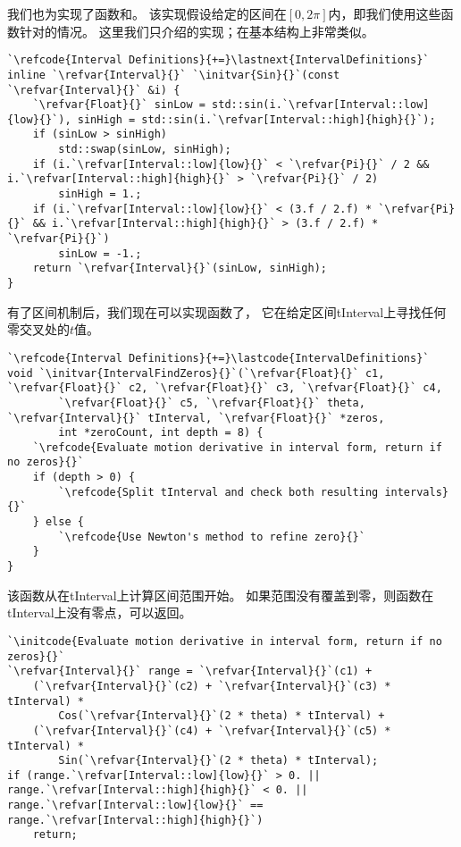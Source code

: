 我们也为实现了函数和。
该实现假设给定的区间在$[0,2\pi]$内，即我们使用这些函数针对的情况。
这里我们只介绍的实现；在基本结构上非常类似。
\begin{lstlisting}
`\refcode{Interval Definitions}{+=}\lastnext{IntervalDefinitions}`
inline `\refvar{Interval}{}` `\initvar{Sin}{}`(const `\refvar{Interval}{}` &i) {
    `\refvar{Float}{}` sinLow = std::sin(i.`\refvar[Interval::low]{low}{}`), sinHigh = std::sin(i.`\refvar[Interval::high]{high}{}`);
    if (sinLow > sinHigh)
        std::swap(sinLow, sinHigh);
    if (i.`\refvar[Interval::low]{low}{}` < `\refvar{Pi}{}` / 2 && i.`\refvar[Interval::high]{high}{}` > `\refvar{Pi}{}` / 2)
        sinHigh = 1.;
    if (i.`\refvar[Interval::low]{low}{}` < (3.f / 2.f) * `\refvar{Pi}{}` && i.`\refvar[Interval::high]{high}{}` > (3.f / 2.f) * `\refvar{Pi}{}`)
        sinLow = -1.;
    return `\refvar{Interval}{}`(sinLow, sinHigh);
}
\end{lstlisting}

有了区间机制后，我们现在可以实现函数了，
它在给定区间{\ttfamily tInterval}上寻找任何零交叉处的$t$值。
\begin{lstlisting}
`\refcode{Interval Definitions}{+=}\lastcode{IntervalDefinitions}`
void `\initvar{IntervalFindZeros}{}`(`\refvar{Float}{}` c1, `\refvar{Float}{}` c2, `\refvar{Float}{}` c3, `\refvar{Float}{}` c4,
        `\refvar{Float}{}` c5, `\refvar{Float}{}` theta, `\refvar{Interval}{}` tInterval, `\refvar{Float}{}` *zeros,
        int *zeroCount, int depth = 8) {
    `\refcode{Evaluate motion derivative in interval form, return if no zeros}{}`
    if (depth > 0) {
        `\refcode{Split tInterval and check both resulting intervals}{}`
    } else {
        `\refcode{Use Newton's method to refine zero}{}`
    }
}
\end{lstlisting}

该函数从在{\ttfamily tInterval}上计算区间范围开始。
如果范围没有覆盖到零，则函数在{\ttfamily tInterval}上没有零点，可以返回。
\begin{lstlisting}
`\initcode{Evaluate motion derivative in interval form, return if no zeros}{}`
`\refvar{Interval}{}` range = `\refvar{Interval}{}`(c1) +
    (`\refvar{Interval}{}`(c2) + `\refvar{Interval}{}`(c3) * tInterval) *
        Cos(`\refvar{Interval}{}`(2 * theta) * tInterval) +
    (`\refvar{Interval}{}`(c4) + `\refvar{Interval}{}`(c5) * tInterval) *
        Sin(`\refvar{Interval}{}`(2 * theta) * tInterval);
if (range.`\refvar[Interval::low]{low}{}` > 0. || range.`\refvar[Interval::high]{high}{}` < 0. || range.`\refvar[Interval::low]{low}{}` == range.`\refvar[Interval::high]{high}{}`)
    return;
\end{lstlisting}

